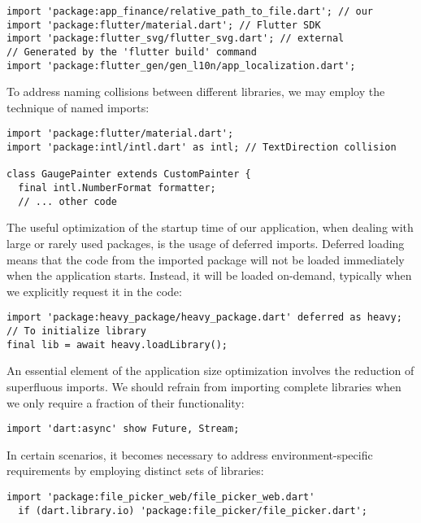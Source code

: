 \begin{lstlisting}
import 'package:app_finance/relative_path_to_file.dart'; // our
import 'package:flutter/material.dart'; // Flutter SDK
import 'package:flutter_svg/flutter_svg.dart'; // external
// Generated by the 'flutter build' command
import 'package:flutter_gen/gen_l10n/app_localization.dart';
\end{lstlisting}

\noindent To address naming collisions between different libraries, we may employ the technique of named imports:

\begin{lstlisting}
import 'package:flutter/material.dart';
import 'package:intl/intl.dart' as intl; // TextDirection collision

class GaugePainter extends CustomPainter {
  final intl.NumberFormat formatter;
  // ... other code
\end{lstlisting}

\noindent The useful optimization of the startup time of our application, when dealing with large or rarely used 
packages, is the usage of deferred imports. Deferred loading means that the code from the imported package will not be 
loaded immediately when the application starts. Instead, it will be loaded on-demand, typically when we explicitly 
request it in the code:

\begin{lstlisting}
import 'package:heavy_package/heavy_package.dart' deferred as heavy;
// To initialize library
final lib = await heavy.loadLibrary();
\end{lstlisting}

\noindent An essential element of the application size optimization involves the reduction of superfluous imports. 
We should refrain from importing complete libraries when we only require a fraction of their functionality:

\begin{lstlisting}
import 'dart:async' show Future, Stream;
\end{lstlisting}

\noindent In certain scenarios, it becomes necessary to address environment-specific requirements by employing distinct 
sets of libraries:

\begin{lstlisting}
import 'package:file_picker_web/file_picker_web.dart' 
  if (dart.library.io) 'package:file_picker/file_picker.dart';
\end{lstlisting}


